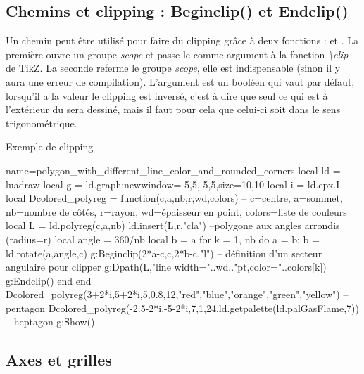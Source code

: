 \subsection{Chemins et clipping : Beginclip() et Endclip()}

Un chemin peut être utilisé pour faire du clipping grâce à deux fonctions :  et . La première ouvre un groupe \emph{scope} et passe le  comme argument à la fonction \emph{\textbackslash clip} de TikZ. La seconde referme le groupe \emph{scope}, elle est indispensable (sinon il y aura une erreur de compilation).
L'argument  est un booléen qui vaut \false par défaut, lorsqu'il a la valeur \true le clipping est inversé, c'est à dire que seul ce qui est à l'extérieur du  sera dessiné, mais il faut pour cela que celui-ci soit dans le sens trigonométrique.

\begin{demo}{Exemple de clipping}
\begin{luadraw}{name=polygon_with_different_line_color_and_rounded_corners}
local ld = luadraw
local g = ld.graph:new{window={-5,5,-5,5},size={10,10}}
local i = ld.cpx.I
local Dcolored_polyreg = function(c,a,nb,r,wd,colors)
-- c=centre, a=sommet, nb=nombre de côtés, r=rayon, wd=épaisseur en point, colors=liste de couleurs
    local L = ld.polyreg(c,a,nb)
    ld.insert(L,{r,"cla"}) --polygone aux angles arrondis (radius=r)
    local angle = 360/nb
    local b = a
    for k = 1, nb do
        a = b; b = ld.rotate(a,angle,c)
        g:Beginclip({2*a-c,c,2*b-c,"l"}) -- définition d'un secteur angulaire pour clipper
        g:Dpath(L,"line width="..wd.."pt,color="..colors[k])
        g:Endclip()
    end
end
Dcolored_polyreg(3+2*i,5+2*i,5,0.8,12,{"red","blue","orange","green","yellow"}) -- pentagon
Dcolored_polyreg(-2.5-2*i,-5-2*i,7,1,24,ld.getpalette(ld.palGasFlame,7)) -- heptagon
g:Show()
\end{luadraw}
\end{demo}


\subsection{Axes et grilles}


